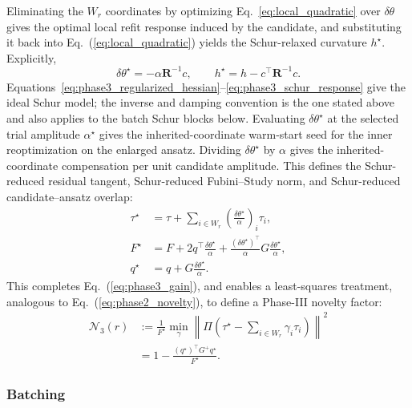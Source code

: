 \documentclass[
  reprint,
  amsmath,
  amssymb,
  aps,
  pra,
  nofootinbib,
  superscriptaddress,
  floatfix
]{revtex4-2}
\begin{document}
Eliminating the \(W_r\) coordinates by optimizing Eq.~\ref{eq:local_quadratic} over $\delta\theta$ gives the optimal local refit response induced by the candidate, and substituting it back into Eq.~(\ref{eq:local_quadratic}) yields the Schur-relaxed curvature $h^\star$. Explicitly,
\begin{equation}
\delta\theta^\star=-\alpha\mathbf R^{-1}c,
\qquad
h^\star=h-c^{\top}\mathbf R^{-1}c .
\label{eq:phase3_schur_response}
\end{equation}
Equations~\eqref{eq:phase3_regularized_hessian}--\eqref{eq:phase3_schur_response} give the ideal Schur model; the inverse and damping convention is the one stated above and also applies to the batch Schur blocks below.
Evaluating $\delta\theta^\star$ at the selected trial amplitude $\alpha^\star$ gives the inherited-coordinate warm-start seed for the inner reoptimization on the enlarged ansatz. Dividing $\delta\theta^\star$ by $\alpha$ gives the inherited-coordinate compensation per unit candidate amplitude. This defines the Schur-reduced residual tangent, Schur-reduced Fubini--Study norm, and Schur-reduced candidate--ansatz overlap:
\begin{equation}
\begin{aligned}
\tau^\star
&=\tau+\sum_{i\in W_r}\left(\frac{\delta\theta^\star}{\alpha}\right)_i\tau_i,\\
F^\star
&=F+2q^{\top}\frac{\delta\theta^\star}{\alpha}
+\frac{(\delta\theta^\star)^{\top}}{\alpha}G\frac{\delta\theta^\star}{\alpha},\\
q^\star
&=q+G\frac{\delta\theta^\star}{\alpha}.
\end{aligned}
\label{eq:phase3_star_geometry}
\end{equation}
This completes Eq.~(\ref{eq:phase3_gain}), and enables a least-squares treatment, analogous to Eq.~(\ref{eq:phase2_novelty}), to define a Phase-III novelty factor:
\begin{equation}
\begin{aligned}
\mathcal N_3(r)
&:=
\frac{1}{F^\star}
\min_{\gamma}
\left\|
\Pi\left(\tau^\star-\sum_{i\in W_r}\gamma_i\tau_i\right)
\right\|^2 \\
&=
1-\frac{(q^\star)^{\top}G^+q^\star}
{F^\star}.
\end{aligned}
\label{eq:phase3_novelty}
\end{equation}

\subsubsection{Batching}
\end{document}
